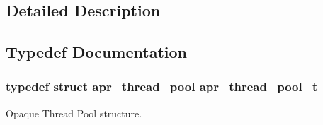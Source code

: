 \subsection{Detailed Description}


\subsection{Typedef Documentation}
\hypertarget{group___a_p_r___util___t_p_gab31b68a03a0d5eec3e1879c253d3b620}{
\subsubsection[{apr\-\_\-thread\-\_\-pool\-\_\-t}]{\setlength{\rightskip}{0pt plus 5cm}typedef struct apr\-\_\-thread\-\_\-pool {\bf apr\-\_\-thread\-\_\-pool\-\_\-t}}}\label{group___a_p_r___util___t_p_gab31b68a03a0d5eec3e1879c253d3b620}
Opaque Thread Pool structure. 

